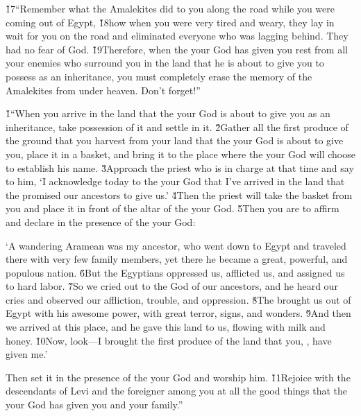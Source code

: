 \v{17}``Remember what the Amalekites did to you along the road while you were coming out of Egypt, \v{18}how when you were very tired and weary, they lay in wait for you on the road and eliminated everyone who was lagging behind. They had no fear of God. \v{19}Therefore, when the  your God has given you rest from all your enemies who surround you in the land that he is about to give you to possess as an inheritance, you must completely erase the memory of the Amalekites from under heaven. Don't forget!''

\v{1}``When you arrive in the land that the  your God is about to give you as an inheritance, take possession of it and settle in it. \v{2}Gather all the first produce of the ground that you harvest from your land that the  your God is about to give you, place it in a basket, and bring it to the place where the  your God will choose to establish his name. \v{3}Approach the priest who is in charge at that time and say to him, `I acknowledge today to the  your God that I've arrived in the land that the  promised our ancestors to give us.' \v{4}Then the priest will take the basket from you and place it in front of the altar of the  your God. \v{5}Then you are to affirm and declare in the presence of the  your God:

\begin{poetry}
\poeml `A wandering Aramean was my ancestor, who went down to Egypt and traveled there with very few family members, yet there he became a great, powerful, and populous nation. \v{6}But the Egyptians oppressed us, afflicted us, and assigned us to hard labor. \v{7}So we cried out to the  God of our ancestors, and he heard our cries and observed our affliction, trouble, and oppression. \v{8}The  brought us out of Egypt with his awesome power, with great terror, signs, and wonders. \v{9}And then we arrived at this place, and he gave this land to us, flowing with milk and honey. \v{10}Now, look---I brought the first produce of the land that you, , have given me.'
\end{poetry}

Then set it in the presence of the  your God and worship him. \v{11}Rejoice with the descendants of Levi and the foreigner among you at all the good things that the  your God has given you and your family.''

